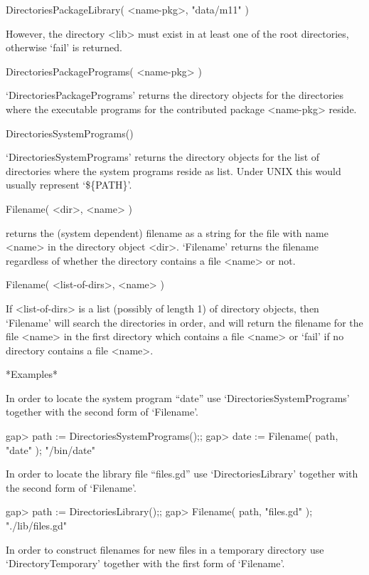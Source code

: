 \begintt
    DirectoriesPackageLibrary( <name-pkg>, "data/m11" )
\endtt

However,   the directory <lib>  must  exist in at   least one of the root
directories, otherwise `fail' is returned.

\>DirectoriesPackagePrograms( <name-pkg> )

`DirectoriesPackagePrograms'   returns  the directory   objects   for the
directories where the  executable programs  for the contributed   package
<name-pkg> reside.

\>DirectoriesSystemPrograms()

`DirectoriesSystemPrograms' returns the directory objects for the list of
directories where  the system programs reside as  list.  Under  UNIX this
would usually represent `\$\{PATH\}'.


\>Filename( <dir>, <name> )

returns the (system  dependent)  filename as  a string for  the file with
name   <name> in the  directory  object  <dir>.   `Filename' returns  the
filename regardless of  whether the directory contains  a file <name>  or
not.

\>Filename( <list-of-dirs>, <name> )

If <list-of-dirs> is a list (possibly  of length 1) of directory objects,
then `Filename' will search the directories in order, and will return the
filename for the file <name> in the first directory which contains a file
<name> or `fail' if no directory contains a file <name>.

*Examples*

In    order  to      locate   the    system   program    ``date''     use
`DirectoriesSystemPrograms' together with the second form of `Filename'.

\begintt
    gap> path := DirectoriesSystemPrograms();;
    gap> date := Filename( path, "date" );
    "/bin/date"
\endtt

In order to locate the library file ``files.gd'' use `DirectoriesLibrary'
together with the second form of `Filename'.

\begintt
    gap> path := DirectoriesLibrary();;
    gap> Filename( path, "files.gd" );
    "./lib/files.gd"
\endtt

In  order to construct filenames for  new  files in a temporary directory
use `DirectoryTemporary' together with the first form of `Filename'.

